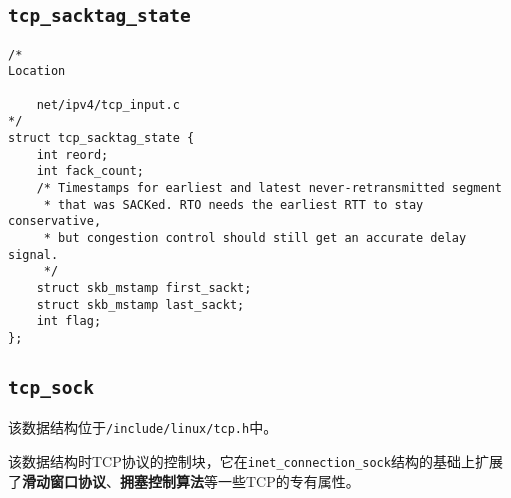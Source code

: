         \subsection{\texttt{tcp_sacktag_state}}
\begin{verbatim}
/*
Location
    
    net/ipv4/tcp_input.c
*/
struct tcp_sacktag_state {
    int reord;
    int fack_count;
    /* Timestamps for earliest and latest never-retransmitted segment
     * that was SACKed. RTO needs the earliest RTT to stay conservative,
     * but congestion control should still get an accurate delay signal.
     */
    struct skb_mstamp first_sackt;
    struct skb_mstamp last_sackt;
    int flag;
};
\end{verbatim}           
        \subsection{\texttt{tcp_sock}}

            该数据结构位于\texttt{/include/linux/tcp.h}中。

            该数据结构时TCP协议的控制块，它在\texttt{inet_connection_sock}结构的基础上扩展了\textbf{滑动窗口协议}、\textbf{拥塞控制算法}等一些TCP的专有属性。
            
